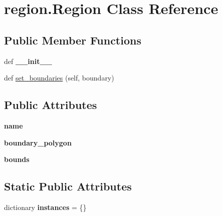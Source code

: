 \hypertarget{classregion_1_1_region}{}\section{region.\+Region Class Reference}
\label{classregion_1_1_region}
\subsection*{Public Member Functions}
\begin{DoxyCompactItemize}
\item 
\hypertarget{classregion_1_1_region_a5481ca1f882d196c24cb5876a9dd17b7}{}def {\bfseries \+\_\+\+\_\+init\+\_\+\+\_\+}\label{classregion_1_1_region_a5481ca1f882d196c24cb5876a9dd17b7}

\item 
def \hyperlink{classregion_1_1_region_ab010509ab92699cce3a29584b5bfbf87}{set\+\_\+boundaries} (self, boundary)
\end{DoxyCompactItemize}
\subsection*{Public Attributes}
\begin{DoxyCompactItemize}
\item 
\hypertarget{classregion_1_1_region_a1acb0c939379ea8bfdc5407214ab5444}{}{\bfseries name}\label{classregion_1_1_region_a1acb0c939379ea8bfdc5407214ab5444}

\item 
\hypertarget{classregion_1_1_region_acbfb565824f33820de559559b5c1cf87}{}{\bfseries boundary\+\_\+polygon}\label{classregion_1_1_region_acbfb565824f33820de559559b5c1cf87}

\item 
\hypertarget{classregion_1_1_region_a3ddcfe9b0f68ab5f4dce9eed39ae369d}{}{\bfseries bounds}\label{classregion_1_1_region_a3ddcfe9b0f68ab5f4dce9eed39ae369d}

\end{DoxyCompactItemize}
\subsection*{Static Public Attributes}
\begin{DoxyCompactItemize}
\item 
\hypertarget{classregion_1_1_region_ad6e627f3c120cf1fbfec6b40b771c760}{}dictionary {\bfseries instances} = \{\}\label{classregion_1_1_region_ad6e627f3c120cf1fbfec6b40b771c760}

\end{DoxyCompactItemize}



